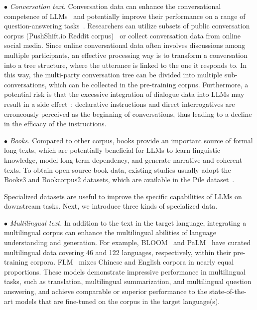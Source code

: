 $\bullet$ \emph{Conversation text.} %
Conversation data can enhance the conversational competence of LLMs~\cite{Zhang-arxiv-2022-OPT} and potentially improve their performance on a range of question-answering tasks~\cite{Chowdhery-arxiv-2022-PaLM}. 
Researchers can utilize  subsets of public conversation corpus (\eg PushShift.io Reddit corpus)~\cite{Roller-ACL-2021-Recipes,Baumgartner-AAAI-2020-The} or collect conversation data from online social media.  
{Since online conversational data often involves discussions among multiple participants, an effective processing way  is to transform a conversation into a tree structure, where the utterance is linked to the one it responds to.
In this way, the multi-party conversation tree can be divided into multiple sub-conversations, which can be collected in the pre-training corpus.}
Furthermore, a potential risk is that the excessive integration of dialogue data into LLMs may result in a side effect~\cite{Zhang-arxiv-2022-OPT}:  declarative instructions and direct interrogatives are erroneously perceived as the beginning of conversations, thus leading to a decline in the efficacy of the instructions. 

$\bullet$ \emph{Books.} Compared to other corpus, books provide an important source of  formal long texts, which are potentially   beneficial for %
{LLMs to learn  linguistic knowledge, model long-term dependency, and generate narrative and coherent texts.}
To obtain open-source book data, existing studies usually adopt the Books3 and Bookcorpus2 datasets, which are available in the Pile dataset~\cite{Gao-arxiv-2021-Pile}. 

 Specialized  datasets are  useful to improve the specific capabilities of LLMs on downstream tasks.  
Next, we introduce three kinds of specialized data.

$\bullet$ \emph{Multilingual text.}  
In addition to the text in the target language, 
integrating a multilingual corpus can enhance the multilingual abilities of language understanding and generation. 
 For example, BLOOM~\cite{Scao-arxiv-2022-BLOOM} and PaLM~\cite{Chowdhery-arxiv-2022-PaLM} have curated multilingual data covering 46 and 122 languages, respectively, within their pre-training corpora. FLM~\cite{Li-arxiv-2023-FLM} mixes Chinese and English corpora in nearly equal proportions. These models demonstrate impressive performance in multilingual tasks, such as translation, multilingual summarization, and multilingual question answering, and achieve comparable or superior performance to the state-of-the-art models that are fine-tuned on the corpus in the target language(s).


